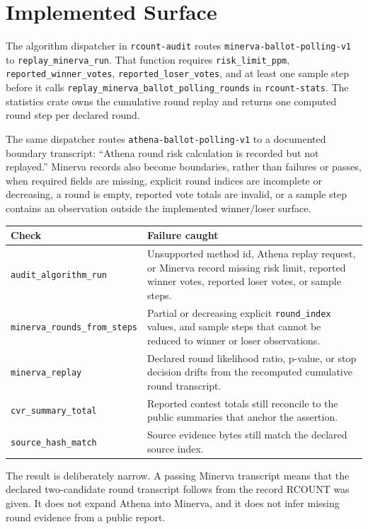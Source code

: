 \section{Implemented Surface}

The algorithm dispatcher in \texttt{rcount-audit} routes
\texttt{minerva-ballot-polling-v1} to \texttt{replay\_minerva\_run}. That
function requires \texttt{risk\_limit\_ppm}, \texttt{reported\_winner\_votes},
\texttt{reported\_loser\_votes}, and at least one sample step before it calls
\texttt{replay\_minerva\_ballot\_polling\_rounds} in \texttt{rcount-stats}.
The statistics crate owns the cumulative round replay and returns one computed
round step per declared round.

The same dispatcher routes \texttt{athena-ballot-polling-v1} to a documented
boundary transcript: ``Athena round risk calculation is recorded but not
replayed.'' Minerva records also become boundaries, rather than failures or
passes, when required fields are missing, explicit round indices are incomplete
or decreasing, a round is empty, reported vote totals are invalid, or a sample
step contains an observation outside the implemented winner/loser surface.

\begin{center}
\small
\begin{tabularx}{\textwidth}{lX}
\toprule
Check & Failure caught \\
\midrule
\texttt{audit\_algorithm\_run} & Unsupported method id, Athena replay request, or Minerva record missing risk limit, reported winner votes, reported loser votes, or sample steps. \\
\texttt{minerva\_rounds\_from\_steps} & Partial or decreasing explicit \texttt{round\_index} values, and sample steps that cannot be reduced to winner or loser observations. \\
\texttt{minerva\_replay} & Declared round likelihood ratio, p-value, or stop decision drifts from the recomputed cumulative round transcript. \\
\texttt{cvr\_summary\_total} & Reported contest totals still reconcile to the public summaries that anchor the assertion. \\
\texttt{source\_hash\_match} & Source evidence bytes still match the declared source index. \\
\bottomrule
\end{tabularx}
\end{center}

The result is deliberately narrow. A passing Minerva transcript means that the
declared two-candidate round transcript follows from the record RCOUNT was
given. It does not expand Athena into Minerva, and it does not infer missing
round evidence from a public report.
